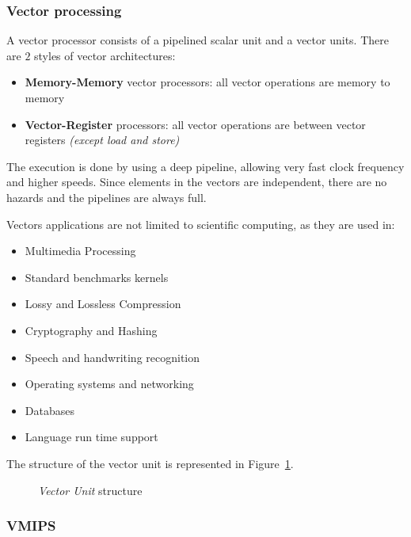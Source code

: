 \documentclass[english]{article}
\begin{document}
\subsubsection{Vector processing}

A vector processor consists of a pipelined scalar unit and a vector units.
There are \(2\) styles of vector architectures:

\begin{itemize}
  \item \textbf{Memory-Memory} vector processors: all vector operations are memory to memory
  \item \textbf{Vector-Register} processors: all vector operations are between vector registers \textit{(except load and store)}
\end{itemize}

The execution is done by using a deep pipeline, allowing very fast clock frequency and higher speeds.
Since elements in the vectors are independent, there are no hazards and the pipelines are always full.

Vectors applications are not limited to scientific computing, as they are used in:

\begin{itemize}
  \item Multimedia Processing
  \item Standard benchmarks kernels
  \item Lossy and Lossless Compression
  \item Cryptography and Hashing
  \item Speech and handwriting recognition
  \item Operating systems and networking
  \item Databases
  \item Language run time support
\end{itemize}

The structure of the vector unit is represented in Figure~\ref{fig:vector-unit-structure}.

\begin{figure}
  \bigskip
  \centering
  \caption{\textit{Vector Unit} structure}
  \label{fig:vector-unit-structure}
  \bigskip
\end{figure}

\subsubsection{VMIPS}
\end{document}
